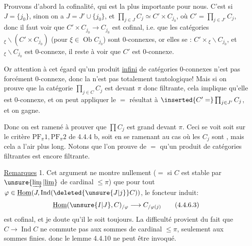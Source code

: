 Prouvons d'abord la cofinalité, qui est la plus importante pour nous. C'est  si $J=\{j_0\}$, sinon on a $J=J'\cup\{j_0\}$, et $\prod_{j\in J}C_j\simeq C'\times C_{j_0}$, où $C'=\prod_{j\in J'}C_j$, donc il faut voir que $C'\times C_{j_0}\longrightarrow C_{j_0}$ est cofinal, i.e. que les catégories ${}_{\xi}\backslash(C'\times C_{j_0})$ (pour $\xi\in\operatorname{Ob}C_{j_0}$) sont $0$-connexes, or  elles se : $C'\times{}_{\xi}\backslash C_{j_0}$, et ${}_{\xi}\backslash C_{j_0}$ est $0$-connexe, il reste à voir que $C'$ est $0$-connexe.

Or  attention à cet égard qu'un produit \uline{infini} de catégories $0$-connexes n'est pas forcément $0$-connexe, donc  la   n'est pas totalement tautologique! Mais si on prouve que la catégorie $\prod_{j\in C}C_j$ est
 devant $\pi$ donc filtrante, cela implique qu'elle est $0$-connexe, et on peut appliquer le $=$ résultat à $\inserted{C'=}\prod_{j\in J'}C_j$, et on gagne.

Donc on est ramené à prouver que  $\prod C_j$ est grand devant $\pi$. Ceci  se voit soit sur le critère $\mathrm{PF}_{\pi}1,\mathrm{PF}_{\pi}2$ de 4.4.4 b, soit  en se ramenant au cas  où les $C_j$ sont , mais cela a l'air plus long. Notons que l'on prouve de $=$ qu'un  produit de catégories filtrantes est encore  filtrante.

\uline{Remarques} 1. Cet argument ne montre nullement ($=$ si $C$ est stable par $\unsure{\varinjlim|\underline{\lim}}$ de cardinal $\leq\pi$) que pour tout $\varphi\in\underline{\operatorname{Hom}}(J,\operatorname{Ind}(\deleted{\unsure{J|j}}C))$, le foncteur induit:
\[
\underline{\operatorname{Hom}}(\unsure{I|J},C)_{/\varphi}\longrightarrow C_{/\varphi(j)}
\tag*{(4.4.6.3)}
\]
est cofinal, et je doute qu'il le soit toujours. La difficulté provient du fait que $C\longrightarrow\operatorname{Ind}C$ ne commute pas aux sommes de cardinal $\leq\pi$, seulement aux sommes finies.
donc le lemme 4.4.10 ne peut être invoqué.

